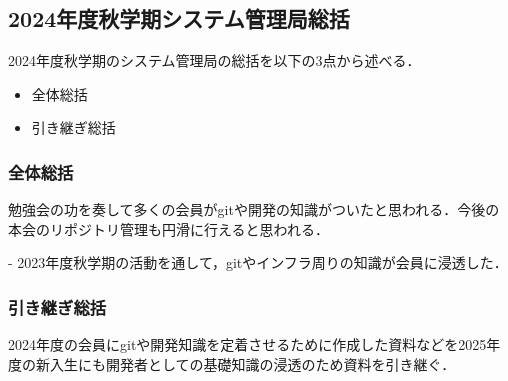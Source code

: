 \subsection*{2024年度秋学期システム管理局総括}


2024年度秋学期のシステム管理局の総括を以下の3点から述べる．
\begin{itemize}
    \item 全体総括
    \item 引き継ぎ総括
\end{itemize}

\subsubsection*{全体総括}
勉強会の功を奏して多くの会員がgitや開発の知識がついたと思われる．今後の本会のリポジトリ管理も円滑に行えると思われる．

- 2023年度秋学期の活動を通して，gitやインフラ周りの知識が会員に浸透した．

\subsubsection*{引き継ぎ総括}
2024年度の会員にgitや開発知識を定着させるために作成した資料などを2025年度の新入生にも開発者としての基礎知識の浸透のため資料を引き継ぐ．
